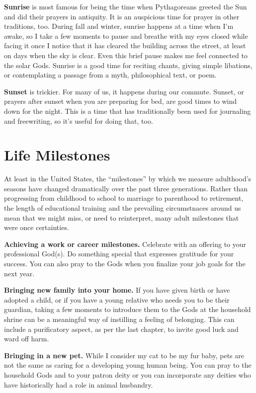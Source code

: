 \documentclass[
]{book}
\begin{document}
\textbf{Sunrise} is most famous for being the time when Pythagoreans greeted the Sun and did their prayers in antiquity. It is an auspicious time for prayer in other traditions, too. During fall and winter, sunrise happens at a time when I'm awake, so I take a few moments to pause and breathe with my eyes closed while facing it once I notice that it has cleared the building across the street, at least on days when the sky is clear. Even this brief pause makes me feel connected to the solar Gods. Sunrise is a good time for reciting chants, giving simple libations, or contemplating a passage from a myth, philosophical text, or poem.

\textbf{Sunset} is trickier. For many of us, it happens during our commute. Sunset, or prayers after sunset when you are preparing for bed, are good times to wind down for the night. This is a time that has traditionally been used for journaling and freewriting, so it's useful for doing that, too.

\hypertarget{life-milestones}{%
\section{Life Milestones}\label{life-milestones}}

At least in the United States, the ``milestones'' by which we measure adulthood's seasons have changed dramatically over the past three generations. Rather than progressing from childhood to school to marriage to parenthood to retirement, the length of educational training and the prevailing circumstnaces around us mean that we might miss, or need to reinterpret, many adult milestones that were once certainties.

\textbf{Achieving a work or career milestones.} Celebrate with an offering to your professional God(s). Do something special that expresses gratitude for your success. You can also pray to the Gods when you finalize your job goals for the next year.

\textbf{Bringing new family into your home.} If you have given birth or have adopted a child, or if you have a young relative who needs you to be their guardian, taking a few moments to introduce them to the Gods at the household shrine can be a meaningful way of instilling a feeling of belonging. This can include a purificatory aspect, as per the last chapter, to invite good luck and ward off harm.

\textbf{Bringing in a new pet.} While I consider my cat to be my fur baby, pets are not the same as caring for a developing young human being. You can pray to the household Gods and to your patron deity or you can incorporate any deities who have historically had a role in animal husbandry.
\end{document}
